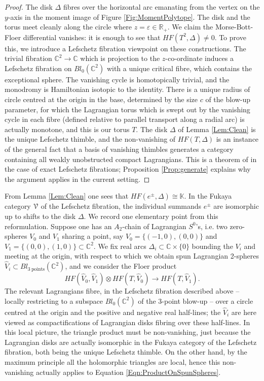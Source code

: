 \documentclass[reqno,10pt]{amsart}
\numberwithin{equation}{section}
\newcommand{\bC}{{\mathbb C}}
\newcommand{\bK}{{\mathbb K}}
\newcommand{\bR}{{\mathbb R}}
\newcommand{\scrV}{\EuScript{V}}
\theoremstyle{remark}
\begin{document}
\begin{proof}
The disk $\Delta$ fibres over the horizontal arc emanating from the vertex on the $y$-axis in the moment image of Figure \ref{Fig:MomentPolytope}.  The disk and the torus meet cleanly along the circle where $z=\varepsilon \in \bR_+$. We claim the Morse-Bott-Floer differential vanishes: it is enough to see that $HF(T^2, \Delta) \neq 0$. To prove this, we introduce 
 a Lefschetz fibration viewpoint on these constructions. The trivial fibration $\bC^2 \rightarrow \bC$ which is projection to the $z$-co-ordinate induces a Lefschetz fibration on $Bl_0(\bC^2)$ with a unique critical fibre, which contains the exceptional sphere. The vanishing cycle is homotopically trivial, and the monodromy is Hamiltonian isotopic to the identity.  There is a unique radius of circle centred at the origin in the base, determined by the size $c$ of the blow-up parameter, for which the Lagrangian torus which is swept out by the vanishing cycle in each fibre (defined relative to parallel transport along a radial arc)  is actually monotone, and this is our torus $T$.  The disk $\Delta$ of Lemma \ref{Lem:Clean} is the unique Lefschetz thimble, and the non-vanishing of $HF(T,\Delta)$ is an instance of the general fact that  a basis of vanishing thimbles generates a category containing all weakly unobstructed compact Lagrangians.  This is a theorem of \cite{FCPLT} in the case of exact Lefschetz fibrations; Proposition \ref{Prop:generate} explains why the argument applies in the current setting. \end{proof}

 From Lemma \ref{Lem:Clean} one sees that $HF(e^{\pm}, \Delta) \cong \bK$.  In the Fukaya category $\scrV$ of the Lefschetz fibration, the individual summands $e^{\pm}$ are isomorphic  up to shifts to the disk $\Delta$.   We record one elementary point from this reformulation.  Suppose one has an $A_2$-chain of Lagrangian $S^0$'s, i.e. two zero-spheres $V_0$ and $V_1$ sharing a point, say $V_0 = \{(-1,0), (0,0)\}$ and $V_1 = \{(0,0), (1,0)\} \subset \bC^2$.  We fix real arcs $\Delta_i \subset \bC\times \{0\}$ bounding the $V_i$ and meeting at the origin, with respect to which we obtain spun Lagrangian 2-spheres $\hat{V}_i \subset Bl_{3 \ \textrm{points}} (\bC^2)$, and we consider the Floer product
\begin{equation} \label{Eqn:ProductOnSpunSpheres}
HF(\hat{V}_0, \hat{V}_1) \otimes HF(T, \hat{V}_0) \longrightarrow HF(T, \hat{V}_1).
\end{equation}
The relevant Lagrangians fibre, in the Lefschetz fibration described above -- locally restricting to a subspace $Bl_0(\bC^2)$ of the 3-point blow-up --  over a circle centred at the origin and the positive and negative real half-lines; the $\hat{V}_i$ are here viewed as compactifications of Lagrangian disks fibring over these half-lines.  In this local picture, the triangle product must be non-vanishing, just because the Lagrangian disks are actually isomorphic in the Fukaya category of the Lefschetz fibration, both being the unique Lefschetz thimble.  On the other hand, by the maximum principle all the holomorphic triangles are local, hence this non-vanishing actually applies to Equation \ref{Eqn:ProductOnSpunSpheres}.
\end{document}
